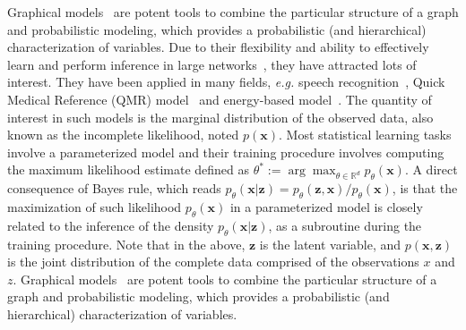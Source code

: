 \documentclass[twoside]{article}
\begin{document}
Graphical models~\cite{madigan1995bayesian,hruschka2007bayesian} are potent tools to combine the particular structure of a graph and probabilistic modeling, which provides a probabilistic (and hierarchical) characterization of variables. 
Due to their flexibility and ability to effectively learn and perform inference in large networks~\cite{koller2007graphical}, they have attracted lots of interest. They have been applied in many fields, \textit{e.g.} speech recognition~\cite{bilmes2005graphical}, Quick Medical Reference (QMR) model~\cite{shwe1990probabilistic} and energy-based model~\cite{jordan1999graphical}.
The quantity of interest in such models is the marginal distribution of the observed data, also known as the incomplete likelihood, noted $p(\mathbf{x})$.
Most statistical learning tasks involve a parameterized model and their training procedure involves computing the maximum likelihood estimate defined as $\theta^* :=  \arg \max_{\theta \in \mathbb{R}^d} p_{\theta}(\mathbf{x})$.
A direct consequence of Bayes rule, which reads $p_{\theta}(\mathbf{x}|\mathbf{z}) = p_{\theta}(\mathbf{z}, \mathbf{x}) / p_{\theta}(\mathbf{x})$, is that the maximization of such likelihood $p_{\theta}(\mathbf{x})$ in a parameterized model is closely related to the inference of the density $p_{\theta}(\mathbf{x}|\mathbf{z})$, as a subroutine during the training procedure.
 Note that in the above, $\mathbf{z}$ is the latent variable, and $p(\mathbf{x}, \mathbf{z})$ is the joint distribution of the complete data comprised of the observations $x$ and $z$. Graphical models~\cite{madigan1995bayesian,hruschka2007bayesian} are potent tools to combine the particular structure of a graph and probabilistic modeling, which provides a probabilistic (and hierarchical) characterization of variables. 
\end{document}
